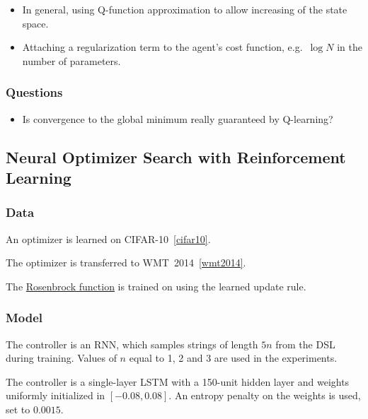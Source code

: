\documentclass[a4paper, 12pt]{article}
\begin{document}
\begin{itemize}
        \item In general, using Q-function approximation to allow increasing of
                the state space.

        \item Attaching a regularization term to the agent's cost function,
                e.g.\ $\log{N}$ in the number of parameters.
\end{itemize}

\subsubsection{Questions}

\begin{itemize}
        \item Is convergence to the global minimum really guaranteed by
                Q-learning?
\end{itemize}


\subsection{Neural Optimizer Search with Reinforcement
            Learning~\citet{neural-optimizer-search-46114}}

\subsubsection{Data}

An optimizer is learned on CIFAR-10~\ref{cifar10}.

The optimizer is transferred to WMT~2014~\ref{wmt2014}.

The \href{https://en.wikipedia.org/wiki/Rosenbrock_function}{Rosenbrock
function} is trained on using the learned update rule.

\subsubsection{Model}


The controller is an RNN, which samples strings of length $5n$ from the DSL
during training. Values of $n$ equal to 1, 2 and 3 are used in the experiments.

The controller is a single-layer LSTM with a \num{150}-unit hidden layer and
weights uniformly initialized in $[-0.08, 0.08]$. An entropy penalty on the
weights is used, set to $0.0015$.
\end{document}
